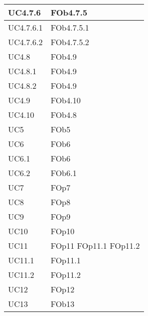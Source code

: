 \begin{longtable}{|l|p{4cm}|}
\hline
		UC4.7.6 & FOb4.7.5 \linebreak   \\
\hline
		UC4.7.6.1 & FOb4.7.5.1 \linebreak   \\
\hline
		UC4.7.6.2 & FOb4.7.5.2 \linebreak   \\
\hline
		UC4.8 & FOb4.9 \linebreak   \\
\hline
		UC4.8.1 & FOb4.9 \linebreak   \\
\hline
		UC4.8.2 & FOb4.9 \linebreak   \\
\hline
		UC4.9 & FOb4.10 \linebreak   \\
\hline
		UC4.10 & FOb4.8 \linebreak   \\
\hline
		UC5 & FOb5 \linebreak   \\
\hline
		UC6 & FOb6 \linebreak   \\
\hline
		UC6.1 & FOb6 \linebreak   \\
\hline
		UC6.2 & FOb6.1 \linebreak   \\
\hline
		UC7 & FOp7 \linebreak   \\
\hline
		UC8 & FOp8 \linebreak   \\
\hline
		UC9 & FOp9 \linebreak   \\
\hline
		UC10 & FOp10 \linebreak   \\
\hline
		UC11 & FOp11 \linebreak  FOp11.1 \linebreak  FOp11.2 \linebreak   \\
\hline
		UC11.1 & FOp11.1 \linebreak   \\
\hline
		UC11.2 & FOp11.2 \linebreak   \\
\hline
		UC12 & FOp12 \linebreak   \\
\hline
		UC13 & FOb13 \linebreak   \\

\end{longtable}
